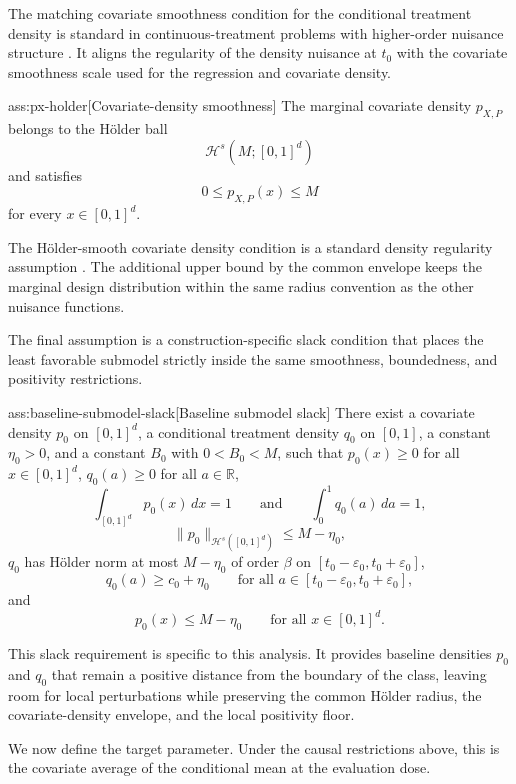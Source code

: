 The matching covariate smoothness condition for the conditional treatment density is standard in continuous-treatment problems with higher-order nuisance structure \citep{bonvini2022}. It aligns the regularity of the density nuisance at \(t_0\) with the covariate smoothness scale used for the regression and covariate density.

\begin{assumptionv}{ass:px-holder}[Covariate-density smoothness]
The marginal covariate density \(p_{X,P}\) belongs to the Hölder ball
\[
\mathcal H^s(M;[0,1]^d)
\]
and satisfies
\[
0 \le p_{X,P}(x) \le M
\]
for every \(x\in[0,1]^d\).
\end{assumptionv}

The Hölder-smooth covariate density condition is a standard density regularity assumption \citep{bonvini2022}. The additional upper bound by the common envelope keeps the marginal design distribution within the same radius convention as the other nuisance functions.

The final assumption is a construction-specific slack condition that places the least favorable submodel strictly inside the same smoothness, boundedness, and positivity restrictions.

\begin{assumptionv}{ass:baseline-submodel-slack}[Baseline submodel slack]
There exist a covariate density \(p_0\) on \([0,1]^d\), a conditional treatment density \(q_0\) on \([0,1]\), a constant \(\eta_0>0\), and a constant \(B_0\) with \(0<B_0<M\), such that \(p_0(x)\ge 0\) for all \(x\in[0,1]^d\), \(q_0(a)\ge 0\) for all \(a\in\mathbb R\),
\[
\int_{[0,1]^d} p_0(x)\,dx=1
\qquad\text{and}\qquad
\int_0^1 q_0(a)\,da=1,
\]
\[
\|p_0\|_{\mathcal H^s([0,1]^d)}\le M-\eta_0,
\]
\(q_0\) has Hölder norm at most \(M-\eta_0\) of order \(\beta\) on \([t_0-\varepsilon_0,t_0+\varepsilon_0]\),
\[
q_0(a)\ge c_0+\eta_0
\qquad\text{for all }a\in[t_0-\varepsilon_0,t_0+\varepsilon_0],
\]
and
\[
p_0(x)\le M-\eta_0
\qquad\text{for all }x\in[0,1]^d.
\]
\end{assumptionv}

This slack requirement is specific to this analysis. It provides baseline densities \(p_0\) and \(q_0\) that remain a positive distance from the boundary of the class, leaving room for local perturbations while preserving the common Hölder radius, the covariate-density envelope, and the local positivity floor.

We now define the target parameter. Under the causal restrictions above, this is the covariate average of the conditional mean at the evaluation dose.

